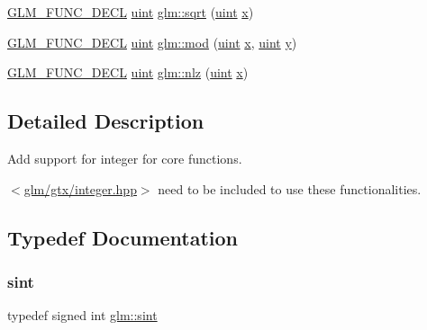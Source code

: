 \begin{DoxyCompactItemize}
\item 
\mbox{\hyperlink{setup_8hpp_ab2d052de21a70539923e9bcbf6e83a51}{G\+L\+M\+\_\+\+F\+U\+N\+C\+\_\+\+D\+E\+CL}} \mbox{\hyperlink{group__core__precision_ga4fd29415871152bfb5abd588334147c8}{uint}} \mbox{\hyperlink{group__gtx__integer_ga457e9efca8339bf918d319e9c55f7c8f}{glm\+::sqrt}} (\mbox{\hyperlink{group__core__precision_ga4fd29415871152bfb5abd588334147c8}{uint}} \mbox{\hyperlink{glad_8h_a92d0386e5c19fb81ea88c9f99644ab1d}{x}})
\item 
\mbox{\hyperlink{setup_8hpp_ab2d052de21a70539923e9bcbf6e83a51}{G\+L\+M\+\_\+\+F\+U\+N\+C\+\_\+\+D\+E\+CL}} \mbox{\hyperlink{group__core__precision_ga4fd29415871152bfb5abd588334147c8}{uint}} \mbox{\hyperlink{group__gtx__integer_gab8f9ec0ca93ca90669434224818f0750}{glm\+::mod}} (\mbox{\hyperlink{group__core__precision_ga4fd29415871152bfb5abd588334147c8}{uint}} \mbox{\hyperlink{glad_8h_a92d0386e5c19fb81ea88c9f99644ab1d}{x}}, \mbox{\hyperlink{group__core__precision_ga4fd29415871152bfb5abd588334147c8}{uint}} \mbox{\hyperlink{glad_8h_a66ddd433d2cacfe27f5906b7e86faeed}{y}})
\item 
\mbox{\hyperlink{setup_8hpp_ab2d052de21a70539923e9bcbf6e83a51}{G\+L\+M\+\_\+\+F\+U\+N\+C\+\_\+\+D\+E\+CL}} \mbox{\hyperlink{group__core__precision_ga4fd29415871152bfb5abd588334147c8}{uint}} \mbox{\hyperlink{group__gtx__integer_gacbe62fd2384464c16ea30ecc4defc11c}{glm\+::nlz}} (\mbox{\hyperlink{group__core__precision_ga4fd29415871152bfb5abd588334147c8}{uint}} \mbox{\hyperlink{glad_8h_a92d0386e5c19fb81ea88c9f99644ab1d}{x}})
\end{DoxyCompactItemize}


\subsection{Detailed Description}
Add support for integer for core functions. 

$<$\mbox{\hyperlink{gtx_2integer_8hpp}{glm/gtx/integer.\+hpp}}$>$ need to be included to use these functionalities. 

\subsection{Typedef Documentation}
\mbox{\label{group__gtx__integer_ga73643e09d8c6d362418aec541fdb987d}} 
\subsubsection{\texorpdfstring{sint}{sint}}
{\footnotesize\ttfamily typedef signed int \mbox{\hyperlink{group__gtx__integer_ga73643e09d8c6d362418aec541fdb987d}{glm\+::sint}}}

